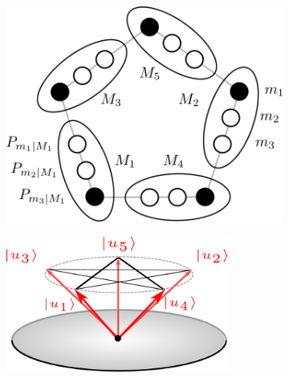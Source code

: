 \begin{figure}
	\begin{subfigure}[t]{0.45\textwidth}
    	\centering
    	\includegraphics[width=\textwidth]{images/mntsandpreps.png}
        \caption{}
	\end{subfigure}
	\hfill
    \begin{subfigure}[t]{0.45\textwidth}
    	\centering 
        \includegraphics[width=0.8\textwidth]{images/kcbsrefstates.png}
        \caption{}
    \end{subfigure}

\end{figure}
